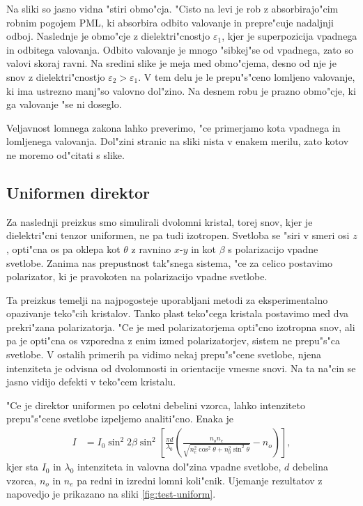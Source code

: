 \documentclass[a4paper,10pt]{article}
\begin{document}
Na sliki so jasno vidna "stiri obmo"cja. 
"Cisto na levi je rob z absorbirajo"cim robnim pogojem \ac{PML}, ki absorbira odbito valovanje in prepre"cuje nadaljnji odboj. 
Naslednje je obmo"cje z dielektri"cnostjo $\varepsilon_1$, kjer je superpozicija vpadnega in odbitega valovanja. 
Odbito valovanje je mnogo "sibkej"se od vpadnega, zato so valovi skoraj ravni. 
Na sredini slike je meja med obmo"cjema, desno od nje je snov z dielektri"cnostjo $\varepsilon_2 > \varepsilon_1$.
V tem delu je le prepu"s"ceno lomljeno valovanje, ki ima ustrezno manj"so valovno dol"zino. 
Na desnem robu je prazno obmo"cje, ki ga valovanje "se ni doseglo. 

Veljavnost lomnega zakona lahko preverimo, "ce primerjamo kota vpadnega in lomljenega valovanja. 
Dol"zini stranic na sliki nista v enakem merilu, zato kotov ne moremo od"citati s slike. 

\subsection{Uniformen direktor}
Za naslednji preizkus smo simulirali dvolomni kristal, torej snov, kjer je dielektri"cni tenzor uniformen, ne pa tudi izotropen. 
Svetloba se "siri v smeri osi $z$, opti"cna os pa oklepa kot $\theta$ z ravnino $x$-$y$ in kot $\beta$ s polarizacijo vpadne svetlobe. 
Zanima nas prepustnost tak"snega sistema, "ce za celico postavimo polarizator, ki je pravokoten na polarizacijo vpadne svetlobe. 

Ta preizkus temelji na najpogosteje uporabljani metodi za eksperimentalno opazivanje teko"cih kristalov. 
Tanko plast teko"cega kristala postavimo med dva prekri"zana polarizatorja. 
"Ce je med polarizatorjema opti"cno izotropna snov, ali pa je opti"cna os vzporedna z enim izmed polarizatorjev, sistem ne prepu"s"ca svetlobe. 
V ostalih primerih pa vidimo nekaj prepu"s"cene svetlobe, njena intenziteta je odvisna od dvolomnosti in orientacije vmesne snovi. 
Na ta na"cin se jasno vidijo defekti v teko"cem kristalu. 

"Ce je direktor uniformen po celotni debelini vzorca, lahko intenziteto prepu"s"cene svetlobe izpeljemo analiti"cno\cite{kleman}. Enaka je
\begin{align}
 I &= I_0 \sin^2 2\beta \sin^2 \left[ \frac{\pi d}{\lambda_0} \left( \frac{n_o n_e}{\sqrt{n_e^2 \cos^2 \theta + n_0^2 \sin^2 \theta}} - n_o \right)\right],
\end{align}
kjer sta $I_0$ in $\lambda_0$ intenziteta in valovna dol"zina vpadne svetlobe, $d$ debelina vzorca, $n_o$ in $n_e$ pa redni in izredni lomni koli"cnik. 
Ujemanje rezultatov z napovedjo je prikazano na sliki \ref{fig:test-uniform}.
\end{document}
